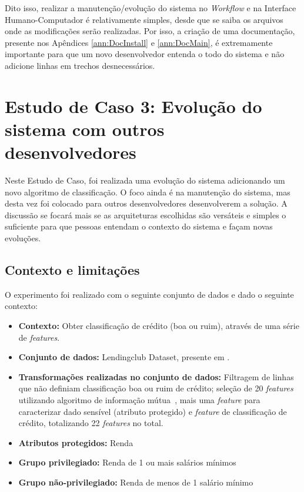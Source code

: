 \documentclass[portugues]{ic-tese}
\begin{document}
Dito isso, realizar a manutenção/evolução do sistema no \textit{Workflow} e na Interface Humano-Computador é relativamente simples, desde que se saiba os arquivos onde as modificações serão realizadas. Por isso, a criação de uma documentação, presente nos Apêndices \ref{ann:DocInstall} e \ref{ann:DocMain}, é extremamente importante para que um novo desenvolvedor entenda o todo do sistema e não adicione linhas em trechos desnecessários.

\chapter{Estudo de Caso 3: Evolução do sistema com outros desenvolvedores}

Neste Estudo de Caso, foi realizada uma evolução do sistema adicionando um novo algoritmo de classificação. O foco ainda é na manutenção do sistema, mas desta vez foi colocado para outros desenvolvedores desenvolverem a solução. A discussão se focará mais se as arquiteturas escolhidas são versáteis e simples o suficiente para que pessoas entendam o contexto do sistema e façam novas evoluções.

\section{Contexto e limitações}

O experimento foi realizado com o seguinte conjunto de dados e dado o seguinte contexto:

\begin{itemize}
\item \textbf{Contexto:} Obter classificação de crédito (boa ou ruim), através de uma série de \textit{features}.

\item \textbf{Conjunto de dados:} Lendingclub Dataset, presente em \citep{lendingclub_2022}.

\item \textbf{Transformações realizadas no conjunto de dados:} Filtragem de linhas que não definiam classificação boa ou ruim de crédito; seleção de 20 \textit{features} utilizando algoritmo de informação mútua~\citep{Ross_2014}, mais uma \textit{feature} para caracterizar dado sensível (atributo protegido) e \textit{feature} de classificação de crédito, totalizando 22 \textit{features} no total.

\item \textbf{Atributos protegidos:} Renda

\item \textbf{Grupo privilegiado:} Renda de 1 ou mais salários mínimos

\item \textbf{Grupo não-privilegiado:} Renda de menos de 1 salário mínimo

\end{itemize}
\end{document}
